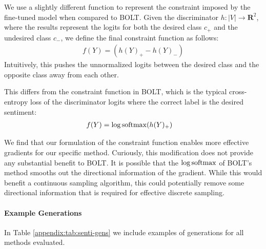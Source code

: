 We use a slightly different function to represent the constraint imposed by the fine-tuned model when compared to BOLT. Given the discriminator $h: |V| \to \mathbf{R}^2$, where the results represent the logits for both the desired class $c_{+}$ and the undesired class $c_{-}$, we define the final constraint function as follows: 
\begin{align*}
    f(Y) = (h(Y)_{+} - h(Y)_{-})
\end{align*}
Intuitively, this pushes the unnormalized logits between the desired class and the opposite class away from each other.

This differs from the constraint function in BOLT, which is the typical cross-entropy loss of the discriminator logits where the correct label is the desired sentiment: 
\begin{align*}
    f(Y) &= \log \mathrm{softmax} (h(Y)_{+})
\end{align*}

We find that our formulation of the constraint function enables more effective gradients for our specific method. 
Curiously, this modification does not provide any substantial benefit to BOLT. 
It is possible that the $\log \mathrm{softmax}$ of BOLT's method smooths out the directional information of the gradient. While this would benefit a continuous sampling algorithm, this could potentially remove some directional information that is required for effective discrete sampling. 

\paragraph{Example Generations} In Table \ref{appendix:tab:senti-gens} we include examples of generations for all methods evaluated.  
